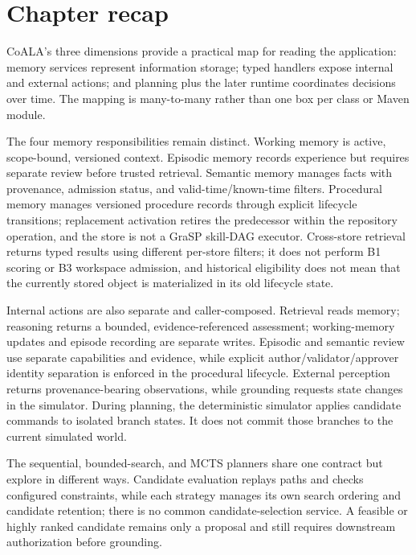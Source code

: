\section{Chapter recap}
\label{sec:ch20-recap}

\begin{chapterrecap}
CoALA's three dimensions provide a practical map for reading the application: memory services represent information storage; typed handlers expose internal and external actions; and planning plus the later runtime coordinates decisions over time. The mapping is many-to-many rather than one box per class or Maven module.

The four memory responsibilities remain distinct. Working memory is active, scope-bound, versioned context. Episodic memory records experience but requires separate review before trusted retrieval. Semantic memory manages facts with provenance, admission status, and valid-time/known-time filters. Procedural memory manages versioned procedure records through explicit lifecycle transitions; replacement activation retires the predecessor within the repository operation, and the store is not a GraSP skill-DAG executor. Cross-store retrieval returns typed results using different per-store filters; it does not perform B1 scoring or B3 workspace admission, and historical eligibility does not mean that the currently stored object is materialized in its old lifecycle state.

Internal actions are also separate and caller-composed. Retrieval reads memory; reasoning returns a bounded, evidence-referenced assessment; working-memory updates and episode recording are separate writes. Episodic and semantic review use separate capabilities and evidence, while explicit author/validator/approver identity separation is enforced in the procedural lifecycle. External perception returns provenance-bearing observations, while grounding requests state changes in the simulator. During planning, the deterministic simulator applies candidate commands to isolated branch states. It does not commit those branches to the current simulated world.

The sequential, bounded-search, and MCTS planners share one contract but explore in different ways. Candidate evaluation replays paths and checks configured constraints, while each strategy manages its own search ordering and candidate retention; there is no common candidate-selection service. A feasible or highly ranked candidate remains only a proposal and still requires downstream authorization before grounding.
\end{chapterrecap}

